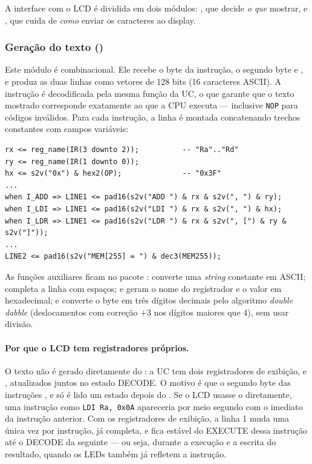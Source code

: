 A interface com o LCD é dividida em dois módulos: , que decide
\emph{o que} mostrar, e , que cuida de \emph{como}
enviar os caracteres ao display.

\subsubsection{Geração do texto ()}

Este módulo é combinacional. Ele recebe o byte da instrução, o segundo byte e
, e produz as duas linhas como vetores de 128 bits (16
caracteres ASCII). A instrução é decodificada pela mesma função 
da UC, o que garante que o texto mostrado corresponde exatamente ao que a CPU
executa --- inclusive \texttt{NOP} para códigos inválidos. Para cada
instrução, a linha é montada concatenando trechos constantes com campos
variáveis:

\begin{lstlisting}[style=vhdl, caption={Montagem da linha 1 (trecho de \texttt{lcd\_text.vhd}).}]
rx <= reg_name(IR(3 downto 2));          -- "Ra".."Rd"
ry <= reg_name(IR(1 downto 0));
hx <= s2v("0x") & hex2(OP);              -- "0x3F"
...
when I_ADD => LINE1 <= pad16(s2v("ADD ") & rx & s2v(", ") & ry);
when I_LDI => LINE1 <= pad16(s2v("LDI ") & rx & s2v(", ") & hx);
when I_LDR => LINE1 <= pad16(s2v("LDR ") & rx & s2v(", [") & ry & s2v("]"));
...
LINE2 <= pad16(s2v("MEM[255] = ") & dec3(MEM255));
\end{lstlisting}

As funções auxiliares ficam no pacote :  converte uma
\emph{string} constante em ASCII;  completa a linha com espaços;
 e  geram o nome do registrador e o valor em
hexadecimal; e  converte o byte em três dígitos decimais pelo
algoritmo \emph{double dabble} (deslocamentos com correção $+3$ nos dígitos
maiores que 4), sem usar divisão.

\paragraph{Por que o LCD tem registradores próprios.} O texto não é gerado
diretamente do : a UC tem dois registradores de exibição,
 e , atualizados juntos no estado DECODE. O motivo
é que o segundo byte das instruções ,  e  só é
lido um estado depois do . Se o LCD usasse o  diretamente, uma
instrução como \texttt{LDI Ra, 0x0A} apareceria por meio segundo com o imediato
da instrução anterior. Com os registradores de exibição, a linha 1 muda uma
única vez por instrução, já completa, e fica estável do EXECUTE dessa instrução
até o DECODE da seguinte --- ou seja, durante a execução e a escrita do
resultado, quando os LEDs também já refletem a instrução.

